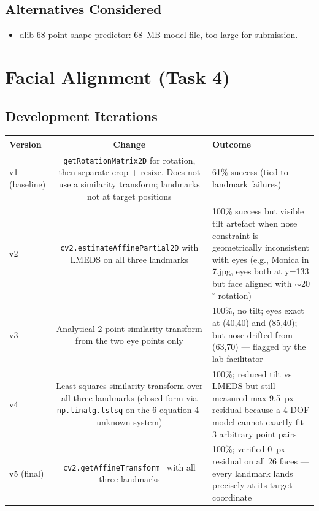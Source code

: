\subsection{Alternatives Considered}
\begin{itemize}
  \item dlib 68-point shape predictor: 68~MB model file, too large for submission.
\end{itemize}

\section{Facial Alignment (Task 4)}

\subsection{Development Iterations}
\noindent
\begin{tabularx}{\linewidth}{@{}V C O@{}}
\toprule
\textbf{Version} & \textbf{Change} & \textbf{Outcome} \\
\midrule
v1 (baseline) & \texttt{getRotationMatrix2D} for rotation, then separate crop
                + resize. Does not use a similarity transform; landmarks not
                at target positions
              & 61\% success (tied to landmark failures) \\
v2 & \texttt{cv2.estimateAffinePartial2D} with LMEDS on all three landmarks
   & 100\% success but visible tilt artefact when nose constraint is geometrically
     inconsistent with eyes (e.g., Monica in 7.jpg, eyes both at y=133 but face
     aligned with $\sim$20$^{\circ}$ rotation) \\
v3 & Analytical 2-point similarity transform from the two eye points only
   & 100\%, no tilt; eyes exact at (40,40) and (85,40); but nose drifted from
     (63,70) --- flagged by the lab facilitator \\
v4 & Least-squares similarity transform over all three landmarks (closed form
     via \texttt{np.linalg.lstsq} on the 6-equation 4-unknown system)
   & 100\%; reduced tilt vs LMEDS but still measured max 9.5~px residual
     because a 4-DOF model cannot exactly fit 3 arbitrary point pairs \\
v5 (final) & \texttt{cv2.getAffineTransform}~\citep{bradski2000opencv} with all
             three landmarks
           & 100\%; verified 0~px residual on all 26 faces --- every landmark
             lands precisely at its target coordinate \\
\bottomrule
\end{tabularx}

